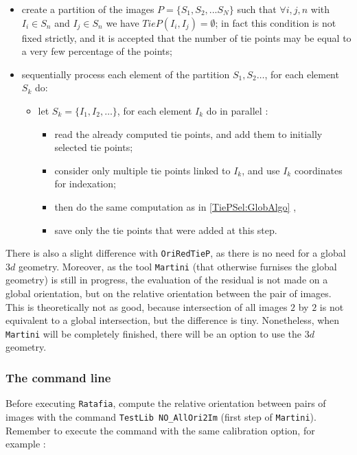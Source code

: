 \begin{itemize}
   \item create a partition of the images $P=\{S_1,S_2,...S_N\}$ such that
         $\forall i,j,n$  with $I_i \in S_n$ and $I_j \in S_n$ we have $ TieP(I_i,I_j) = \emptyset $; 
         in fact this condition is not fixed strictly, and it is accepted that the
          number of tie points may be equal to a very few percentage of the points;
 
   \item sequentially process each element of the partition $S_1, S_2 \dots $, for each element $S_k$  do:

   \begin{itemize}
        \item let  $S_k =\{I_1, I_2 , \dots \} $, for each element $I_k$  do in parallel :
        \begin{itemize}
              \item read the already computed tie points, and add them to initially selected tie points;
              \item consider only multiple tie points linked to $I_k$, and use $I_k$ coordinates for
                    indexation;
              \item then do the same computation as  in  \ref{TiePSel:GlobAlgo} , 
              \item save only the tie points that were added at this step.
        \end{itemize}
   \end{itemize}
\end{itemize}


There is also a slight difference with {\tt OriRedTieP}, as there is no need for a global $3d$ geometry. Moreover, as the tool {\tt Martini} (that otherwise furnises the global geometry) is still in progress, the evaluation of the residual is
not made on a global orientation, but on the relative orientation between the pair of images. This is
theoretically not as good, because intersection of all images $2$ by $2$ is not equivalent to a global
intersection, but the difference is tiny. Nonetheless, when {\tt Martini} will be completely finished, there
will be an option to use the $3d$ geometry.


\subsubsection{The command line}

Before executing {\tt Ratafia}, compute the relative orientation between pairs of images with
the  command {\tt TestLib NO\_AllOri2Im}
(first step of {\tt Martini}). Remember to execute the command with the same calibration option, for example :


